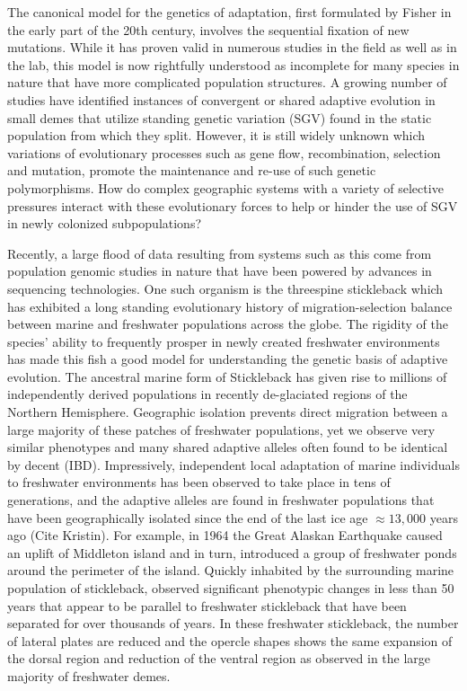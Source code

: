 \documentclass{article}
\begin{document}
The canonical model for the genetics of adaptation, first formulated by Fisher in the early part of the 20th century, involves the sequential fixation of new mutations. 
While it has proven valid in numerous studies in the field as well as in the lab, this model is now rightfully understood as incomplete for many species in nature that have more complicated population structures. 
A growing number of studies have identified instances of convergent or shared adaptive evolution in small demes that utilize standing genetic variation (SGV) found in the static population from which they split.
However, it is still widely unknown which variations of evolutionary processes such as gene flow, recombination, selection and mutation, promote the maintenance and re-use of such genetic polymorphisms.
How do complex geographic systems with a variety of selective pressures interact with these evolutionary forces to help or hinder the use of SGV in newly colonized subpopulations?

Recently, a large flood of data resulting from systems such as this come from population genomic studies in nature that have been powered by advances in sequencing technologies. 
One such organism is the threespine stickleback which has exhibited a long standing evolutionary history of migration-selection balance between marine and freshwater populations across the globe.
The rigidity of the species' ability to frequently prosper in newly created freshwater environments has made this fish a good model for understanding the genetic basis of adaptive evolution. 
The ancestral marine form of Stickleback has given rise to millions of independently derived populations in recently de-glaciated regions of the Northern Hemisphere.
Geographic isolation prevents direct migration between a large majority of these patches of freshwater populations,
yet we observe very similar phenotypes and many shared adaptive alleles often found to be identical by decent (IBD). 
Impressively, independent local adaptation of marine individuals to freshwater environments has been observed to take place in tens of generations, 
and the adaptive alleles are found in freshwater populations that have been geographically isolated since the end of the last ice age $\approx 13,000$ years ago (Cite Kristin).
For example, in 1964 the Great Alaskan Earthquake caused an uplift of Middleton island and in turn, introduced a group of freshwater ponds around the perimeter of the island. 
Quickly inhabited by the surrounding marine population of stickleback, 
\citet{lescak2015evolution} observed significant phenotypic changes in less than 50 years that appear to be parallel to freshwater stickleback that have been separated for over thousands of years. 
In these freshwater stickleback, the number of lateral plates are reduced and the opercle shapes shows
the same expansion of the dorsal region and reduction of the ventral region as observed in the large majority of freshwater demes.
\end{document}
